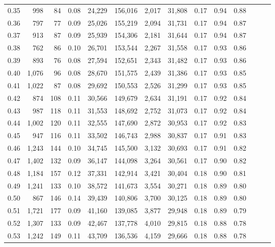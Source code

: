 \begin{tabular}{rrrrrrrrrrrrrr}
0.35 &    998 &     84 &  0.08 &   24,229 &  156,016 &   2,017 &  31,808 &  0.17 &  0.94 &      0.88 \\
0.36 &    797 &     77 &  0.09 &   25,026 &  155,219 &   2,094 &  31,731 &  0.17 &  0.94 &      0.87 \\
0.37 &    913 &     87 &  0.09 &   25,939 &  154,306 &   2,181 &  31,644 &  0.17 &  0.94 &      0.87 \\
0.38 &    762 &     86 &  0.10 &   26,701 &  153,544 &   2,267 &  31,558 &  0.17 &  0.93 &      0.86 \\
0.39 &    893 &     76 &  0.08 &   27,594 &  152,651 &   2,343 &  31,482 &  0.17 &  0.93 &      0.86 \\
0.40 &  1,076 &     96 &  0.08 &   28,670 &  151,575 &   2,439 &  31,386 &  0.17 &  0.93 &      0.85 \\
0.41 &  1,022 &     87 &  0.08 &   29,692 &  150,553 &   2,526 &  31,299 &  0.17 &  0.93 &      0.85 \\
0.42 &    874 &    108 &  0.11 &   30,566 &  149,679 &   2,634 &  31,191 &  0.17 &  0.92 &      0.84 \\
0.43 &    987 &    118 &  0.11 &   31,553 &  148,692 &   2,752 &  31,073 &  0.17 &  0.92 &      0.84 \\
0.44 &  1,002 &    120 &  0.11 &   32,555 &  147,690 &   2,872 &  30,953 &  0.17 &  0.92 &      0.83 \\
0.45 &    947 &    116 &  0.11 &   33,502 &  146,743 &   2,988 &  30,837 &  0.17 &  0.91 &      0.83 \\
0.46 &  1,243 &    144 &  0.10 &   34,745 &  145,500 &   3,132 &  30,693 &  0.17 &  0.91 &      0.82 \\
0.47 &  1,402 &    132 &  0.09 &   36,147 &  144,098 &   3,264 &  30,561 &  0.17 &  0.90 &      0.82 \\
0.48 &  1,184 &    157 &  0.12 &   37,331 &  142,914 &   3,421 &  30,404 &  0.18 &  0.90 &      0.81 \\
0.49 &  1,241 &    133 &  0.10 &   38,572 &  141,673 &   3,554 &  30,271 &  0.18 &  0.89 &      0.80 \\
0.50 &    867 &    146 &  0.14 &   39,439 &  140,806 &   3,700 &  30,125 &  0.18 &  0.89 &      0.80 \\
0.51 &  1,721 &    177 &  0.09 &   41,160 &  139,085 &   3,877 &  29,948 &  0.18 &  0.89 &      0.79 \\
0.52 &  1,307 &    133 &  0.09 &   42,467 &  137,778 &   4,010 &  29,815 &  0.18 &  0.88 &      0.78 \\
0.53 &  1,242 &    149 &  0.11 &   43,709 &  136,536 &   4,159 &  29,666 &  0.18 &  0.88 &      0.78 \\

\end{tabular}
